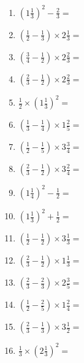 \documentclass[12pt]{article}
\begin{document}
\begin{enumerate}
\newpage
\item \large $ \left( 1 \frac{1}{3} \right)^2 - \frac{2}{3} = $ \vspace{1.6cm}
\item \large $ \left( \frac{1}{2} - \frac{1}{3} \right) \times 2 \frac{1}{3} = $ \vspace{1.6cm}
\item \large $ \left( \frac{3}{4} - \frac{1}{2} \right) \times 2 \frac{2}{3} = $ \vspace{1.6cm}
\item \large $ \left( \frac{2}{3} - \frac{1}{2} \right) \times 2 \frac{2}{3} = $ \vspace{1.6cm}
\item \large $ \frac{1}{2} \times \left( 1 \frac{1}{3} \right)^2 = $ \vspace{1.6cm}
\item \large $ \left( \frac{1}{3} - \frac{1}{4} \right) \times 1 \frac{2}{5} = $ \vspace{1.6cm}
\item \large $ \left( \frac{1}{2} - \frac{1}{5} \right) \times 3 \frac{3}{4} = $ \vspace{1.6cm}
\item \large $ \left( \frac{2}{3} - \frac{1}{2} \right) \times 3 \frac{2}{4} = $ \vspace{1.6cm}
\item \large $ \left( 1 \frac{1}{4} \right)^2 - \frac{1}{2} = $ \vspace{1.6cm}
\item \large $ \left( 1 \frac{1}{3} \right)^2 + \frac{1}{2} = $ \vspace{1.6cm}
\newpage
\item \large $ \left( \frac{1}{2} - \frac{1}{2} \right) \times 3 \frac{1}{3} = $ \vspace{1.6cm}
\item \large $ \left( \frac{2}{3} - \frac{1}{2} \right) \times 1 \frac{1}{3} = $ \vspace{1.6cm}
\item \large $ \left( \frac{2}{3} - \frac{2}{3} \right) \times 2 \frac{3}{5} = $ \vspace{1.6cm}
\item \large $ \left( \frac{1}{2} - \frac{2}{5} \right) \times 1 \frac{2}{4} = $ \vspace{1.6cm}
\item \large $ \left( \frac{2}{3} - \frac{1}{3} \right) \times 3 \frac{1}{2} = $ \vspace{1.6cm}
\item \large $ \frac{1}{3} \times \left( 2 \frac{1}{3} \right)^2 = $ \vspace{1.6cm}

\end{enumerate}
\end{document}
